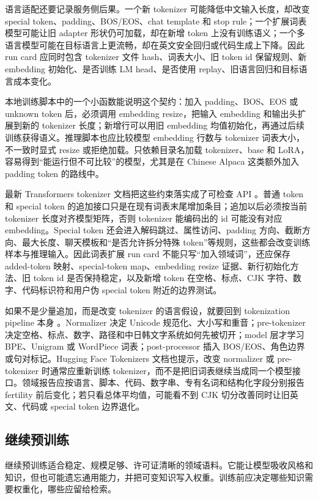 \documentclass[UTF8,zihao=-4,openany]{ctexbook}
\begin{document}
语言适配还要记录服务侧后果。一个新 tokenizer 可能降低中文输入长度，却改变 special token、padding、BOS/EOS、chat template 和 stop rule；一个扩展词表模型可能让旧 adapter 形状仍可加载，却在新增 token 上没有训练语义；一个多语言模型可能在目标语言上更流畅，却在英文安全回归或代码生成上下降。因此 run card 应同时包含 tokenizer 文件 hash、词表大小、旧 token id 保留规则、新 embedding 初始化、是否训练 LM head、是否使用 replay、旧语言回归和目标语言成本变化。

本地训练脚本中的一个小函数能说明这个契约：加入 padding、BOS、EOS 或 unknown token 后，必须调用 embedding resize，把输入 embedding 和输出头扩展到新的 tokenizer 长度；新增行可以用旧 embedding 均值初始化，再通过后续训练获得语义。推理脚本也应比较模型 embedding 行数与 tokenizer 词表大小，不一致时显式 resize 或拒绝加载。只依赖目录名加载 tokenizer、base 和 LoRA，容易得到“能运行但不可比较”的模型，尤其是在 Chinese Alpaca 这类额外加入 padding token 的路线中。

最新 Transformers tokenizer 文档把这些约束落实成了可检查 API \cite{huggingface2026transformerstokenizer}。普通 token 和 special token 的追加接口只是在现有词表末尾增加条目；追加以后必须按当前 tokenizer 长度对齐模型矩阵，否则 tokenizer 能编码出的 id 可能没有对应 embedding。Special token 还会进入解码跳过、属性访问、padding 方向、截断方向、最大长度、聊天模板和“是否允许拆分特殊 token”等规则，这些都会改变训练样本与推理输入。因此词表扩展 run card 不能只写“加入领域词”，还应保存 added-token 映射、special-token map、embedding resize 证据、新行初始化方法、旧 token id 是否保持稳定，以及新增 token 在空格、标点、CJK 字符、数字、代码标识符和用户伪 special token 附近的边界测试。

如果不是少量追加，而是改变 tokenizer 的语言假设，就要回到 tokenization pipeline 本身 \cite{huggingface2026tokenizerspipeline}。Normalizer 决定 Unicode 规范化、大小写和重音；pre-tokenizer 决定空格、标点、数字、路径和中日韩文字系统如何先被切开；model 层才学习 BPE、Unigram 或 WordPiece 词表；post-processor 插入 BOS/EOS、角色边界或句对标记。Hugging Face Tokenizers 文档也提示，改变 normalizer 或 pre-tokenizer 时通常应重新训练 tokenizer，而不是把旧词表继续当成同一个模型接口。领域报告应按语言、脚本、代码、数字串、专有名词和结构化字段分别报告 fertility 前后变化；若只看总体平均值，可能看不到 CJK 切分改善同时让旧英文、代码或 special token 边界退化。

\subsection{继续预训练}
继续预训练适合稳定、规模足够、许可证清晰的领域语料。它能让模型吸收风格和知识，但也可能遗忘通用能力，并把可变知识写入权重。训练前应决定哪些知识需要权重化，哪些应留给检索。
\end{document}
